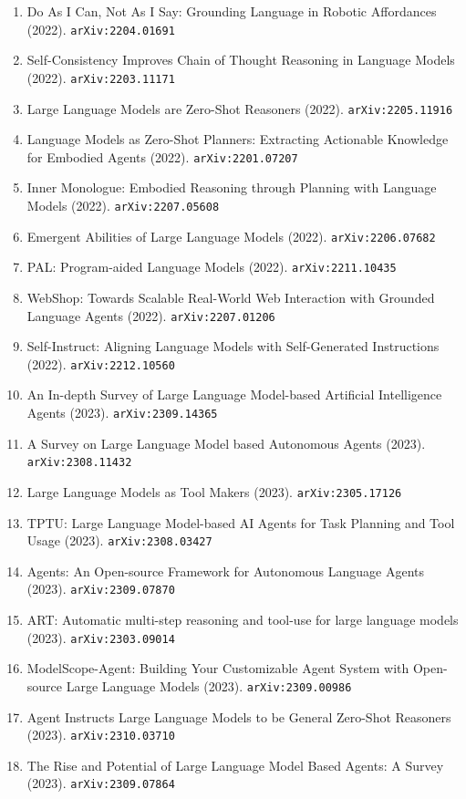 \documentclass[11pt]{article}
\begin{document}
\begin{enumerate}
  \item Do As I Can, Not As I Say: Grounding Language in Robotic Affordances (2022). \texttt{arXiv:2204.01691}
  \item Self-Consistency Improves Chain of Thought Reasoning in Language Models (2022). \texttt{arXiv:2203.11171}
  \item Large Language Models are Zero-Shot Reasoners (2022). \texttt{arXiv:2205.11916}
  \item Language Models as Zero-Shot Planners: Extracting Actionable Knowledge
  for Embodied Agents (2022). \texttt{arXiv:2201.07207}
  \item Inner Monologue: Embodied Reasoning through Planning with Language
  Models (2022). \texttt{arXiv:2207.05608}
  \item Emergent Abilities of Large Language Models (2022). \texttt{arXiv:2206.07682}
  \item PAL: Program-aided Language Models (2022). \texttt{arXiv:2211.10435}
  \item WebShop: Towards Scalable Real-World Web Interaction with Grounded
  Language Agents (2022). \texttt{arXiv:2207.01206}
  \item Self-Instruct: Aligning Language Models with Self-Generated Instructions (2022). \texttt{arXiv:2212.10560}
  \item An In-depth Survey of Large Language Model-based Artificial Intelligence
  Agents (2023). \texttt{arXiv:2309.14365}
  \item A Survey on Large Language Model based Autonomous Agents (2023). \texttt{arXiv:2308.11432}
  \item Large Language Models as Tool Makers (2023). \texttt{arXiv:2305.17126}
  \item TPTU: Large Language Model-based AI Agents for Task Planning and Tool Usage (2023). \texttt{arXiv:2308.03427}
  \item Agents: An Open-source Framework for Autonomous Language Agents (2023). \texttt{arXiv:2309.07870}
  \item ART: Automatic multi-step reasoning and tool-use for large language
  models (2023). \texttt{arXiv:2303.09014}
  \item ModelScope-Agent: Building Your Customizable Agent System with
  Open-source Large Language Models (2023). \texttt{arXiv:2309.00986}
  \item Agent Instructs Large Language Models to be General Zero-Shot Reasoners (2023). \texttt{arXiv:2310.03710}
  \item The Rise and Potential of Large Language Model Based Agents: A Survey (2023). \texttt{arXiv:2309.07864}

\end{enumerate}
\end{document}
